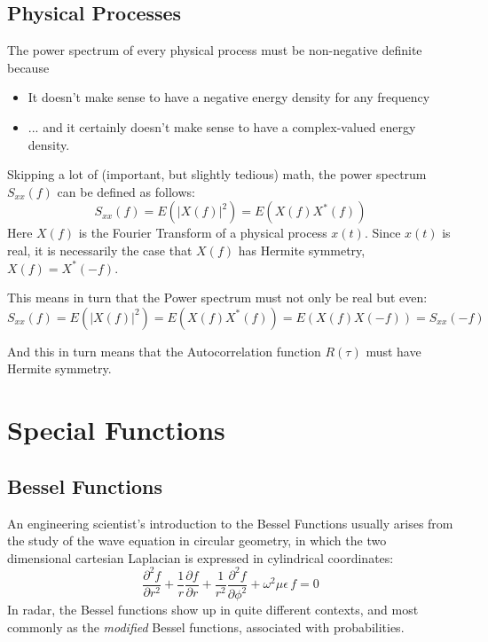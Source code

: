\section{Physical Processes}

The power spectrum of every physical process must be non-negative definite because
\begin{itemize}
\item It doesn't make sense to have a negative energy density for any frequency
\item ... and it certainly doesn't make sense to have a complex-valued energy density.
\end{itemize}

Skipping a lot of (important, but slightly tedious) math, the power spectrum $S_{xx}(f)$ can be defined as follows:
\begin{equation}
S_{xx}(f) = E (|X(f)|^2) = E (X(f)X^\ast(f))
\end{equation}
Here $X(f)$ is the Fourier Transform of a physical process $x(t)$.  Since $x(t)$ is real, it is necessarily the case
that $X(f)$ has Hermite symmetry, $X(f) = X^\ast(-f)$.

This means in turn that the Power spectrum must not only be real but even:
\begin{equation}
S_{xx}(f) = E (|X(f)|^2) = E (X(f)X^\ast(f)) = E (X(f)X(-f)) = S_{xx}(-f)
\end{equation}

And this in turn means that the Autocorrelation function $R(\tau)$ must have Hermite symmetry.

\chapter{Special Functions}

\section{Bessel Functions}

An engineering scientist's introduction to the Bessel Functions usually arises from the study of the wave 
equation in circular geometry, in which the two dimensional cartesian Laplacian is expressed in 
cylindrical coordinates:
\begin{equation}
\frac{\partial^2 f}{\partial r^2} + \frac{1}{r}\frac{\partial f}{\partial r} + \frac{1}{r^2}\frac{\partial^2 f}{\partial \phi^2} + \omega^2 \mu \epsilon \,f = 0
\end{equation}
In radar, the Bessel functions show up in quite different contexts, and most commonly as the 
\textit{modified} Bessel functions, associated with probabilities.
